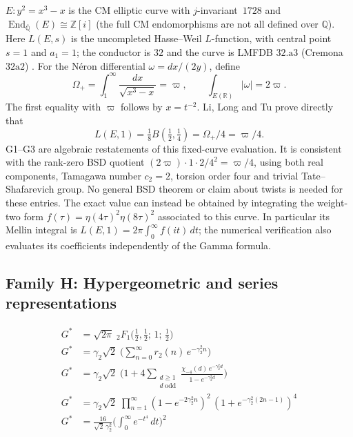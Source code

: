 \documentclass[12pt,reqno]{amsart}
\theoremstyle{definition}
\theoremstyle{remark}
\newcommand{\ZZ}{\mathbb{Z}}
\newcommand{\QQ}{\mathbb{Q}}
\newcommand{\Gstar}{G^{\!*}}
\newcommand{\varpiup}{\varpi}
\newcommand{\End}{\operatorname{End}}
\begin{document}
\noindent
$E\colon y^{2}=x^{3}-x$ is the CM elliptic curve with $j$-invariant~$1728$
and $\End_{\overline{\QQ}}(E)\cong\ZZ[i]$ (the full CM endomorphisms
are not all defined over $\QQ$). Here $L(E,s)$ is the uncompleted
Hasse--Weil $L$-function, with central point $s=1$ and $a_1=1$;
the conductor is $32$ and the curve is LMFDB $32.\mathrm{a}3$
(Cremona $32\mathrm{a}2$) \cite{LMFDB}.
For the N\'eron differential $\omega=dx/(2y)$, define
\[
 \Omega_+=\int_1^\infty\frac{dx}{\sqrt{x^3-x}}=\varpiup,
 \qquad \int_{E(\mathbb R)}|\omega|=2\varpiup.
\]
The first equality with $\varpiup$ follows by $x=t^{-2}$.
Li, Long and Tu \cite[Lemma 3.1]{LiLongTu} prove directly that
\[
 L(E,1)=\tfrac18 B(\tfrac12,\tfrac14)
       =\Omega_+/4=\varpiup/4.
\]
G1--G3 are algebraic restatements of this fixed-curve evaluation.
It is consistent with the rank-zero BSD quotient
$(2\varpiup)\cdot1\cdot2/4^2=\varpiup/4$, using both real
components, Tamagawa number $c_2=2$, torsion order four and trivial
Tate--Shafarevich group. No general BSD theorem or claim about twists
is needed for these entries. The exact value can instead be obtained
by integrating the weight-two form
$f(\tau)=\eta(4\tau)^2\eta(8\tau)^2$ associated to this curve.
In particular its Mellin integral is
$L(E,1)=2\pi\int_0^\infty f(it)\,dt$; the numerical verification
also evaluates its coefficients independently of the Gamma formula.

\subsection{Family H: Hypergeometric and series representations}\label{sec:H}

\begin{align}
  {\Gstar} &= \sqrt{2\pi}\;
    {}_{2}F_{1}\!\bigl(\tfrac12,\tfrac12;\,1;\,\tfrac12\bigr)
    \tag{H1}\label{H1}\\[5pt]
  {\Gstar} &= \gamma_{2}\sqrt{2}\;
    \biggl(\sum_{n=0}^{\infty} r_{2}(n)\,e^{-\gamma_{2}^{2}n}\biggr)
    \tag{H2}\label{H2}\\[5pt]
  {\Gstar} &= \gamma_{2}\sqrt{2}\;
    \biggl(1 + 4\sum_{\substack{d\geq 1\\d\;\mathrm{odd}}}
    \frac{\chi_{-4}(d)\,e^{-\gamma_{2}^{2}d}}
    {1-e^{-\gamma_{2}^{2}d}}\biggr)
    \tag{H3}\label{H3}\\[5pt]
  {\Gstar} &= \gamma_{2}\sqrt{2}\;
    \prod_{n=1}^{\infty}
    (1-e^{-2\gamma_{2}^{2}n})^{2}\,
    (1+e^{-\gamma_{2}^{2}(2n-1)})^{4}
    \tag{H4}\label{H4}\\[5pt]
  {\Gstar} &= \frac{16}{\sqrt{2}\,\gamma_{2}^{2}}
    \biggl(\int_{0}^{\infty}e^{-t^{4}}\,dt\biggr)^{\!2}
    \tag{H5}\label{H5}
\end{align}
\end{document}
